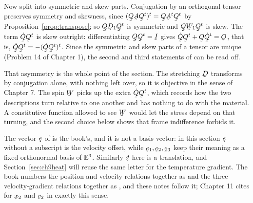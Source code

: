 Now split into symmetric and skew parts. Conjugation by an orthogonal
tensor preserves symmetry and skewness, since
$(\bQ\bA\bQ^{t})^{t}=\bQ\bA^{t}\bQ^{t}$ by
Proposition~\ref{prop:transpose}; so $\bQ\bD_{1}\bQ^{t}$ is symmetric
and $\bQ\bW_{1}\bQ^{t}$ is skew. The term $\dot\bQ\bQ^{t}$ is skew
outright: differentiating $\bQ\bQ^{t}=\I$ gives
$\dot\bQ\bQ^{t}+\bQ\dot\bQ^{t}=\Ob$, that is,
$\dot\bQ\bQ^{t}=-(\dot\bQ\bQ^{t})^{t}$. Since the symmetric and skew
parts of a tensor are unique (Problem 14 of Chapter 1), the second and
third statements of  can be read off.

That asymmetry is the whole point of the section. The stretching $\bD$
transforms by conjugation alone, with nothing left over, so it is
objective in the sense of Chapter 7. The spin $\bW$ picks up the extra
$\dot\bQ\bQ^{t}$, which records how the two descriptions turn relative
to one another and has nothing to do with the material. A constitutive
function allowed to see $\bW$ would let the stress depend on that
turning, and the second choice below shows that frame indifference
forbids it.

\begin{remark}
\label{rem:ch9enote}
The vector $\be$ of  is the book's, and it is not a basis
vector: in this section $\be$ without a subscript is the velocity
offset, while $\be_{1},\be_{2},\be_{3}$ keep their meaning as a fixed
orthonormal basis of $\mathbb{E}^{3}$. Similarly $\bd$ here is a translation, and
Section~\ref{sec:ch9heat} will reuse the same letter for the temperature
gradient. The book numbers the position and velocity relations together
as  and the three velocity-gradient relations together as
, and these notes follow it; Chapter 11 cites  for
$\bx_{2}$ and $\bv_{2}$ in exactly this sense.
\end{remark}

